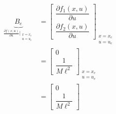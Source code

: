 \documentclass{article}
\numberwithin{equation}{subsection}
\begin{document}
\begin{align*}
    \underbrace{B_e}_{\frac{\partial f(x,u)}{\partial u}\big|_{\substack{\text{$x=x_e$} \\ \text{$u=u_e$}}}} &=
    \begin{bmatrix}
        \dfrac{\partial f_1(x,u)}{\partial u}\\
        \dfrac{\partial f_2(x,u)}{\partial u} 
    \end{bmatrix}_{\substack{\text{$x=x_e$} \\ \text{$u=u_e$}}}\\ &=
    \begin{bmatrix}
        0\\
        \dfrac{1}{M \ell^2}
    \end{bmatrix}_{\substack{\text{$x=x_e$} \\ \text{$u=u_e$}}}\\ &=
    \begin{bmatrix}
        0\\
        \dfrac{1}{M \ell^2}
    \end{bmatrix}
\end{align*}
\end{document}
